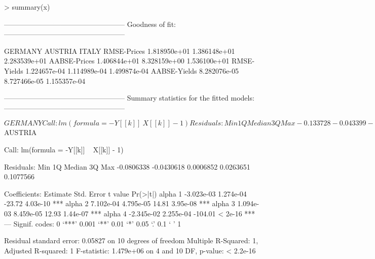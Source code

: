 \begin{Schunk}
\begin{Sinput}
> summary(x)
\end{Sinput}
\begin{Soutput}
---------------------------------------------------
Goodness of fit:
---------------------------------------------------

                  GERMANY      AUSTRIA        ITALY
RMSE-Prices  1.818950e+01 1.386148e+01 2.283539e+01
AABSE-Prices 1.406844e+01 8.328159e+00 1.536100e+01
RMSE-Yields  1.224657e-04 1.114989e-04 1.499874e-04
AABSE-Yields 8.282076e-05 8.727466e-05 1.155357e-04

---------------------------------------------------
Summary statistics for the fitted models:
---------------------------------------------------

$GERMANY

Call:
lm(formula = -Y[[k]] ~ X[[k]] - 1)

Residuals:
      Min        1Q    Median        3Q       Max 
-0.133728 -0.043399 -0.009263  0.019054  0.337135 

Coefficients:
          Estimate Std. Error t value Pr(>|t|)    
alpha 1 -3.156e-03  4.765e-04  -6.623 7.51e-07 ***
alpha 2 -1.804e-04  1.572e-04  -1.148    0.262    
alpha 3  8.893e-04  4.782e-05  18.598 9.25e-16 ***
alpha 4  9.870e-04  6.148e-05  16.053 2.45e-14 ***
alpha 5 -2.357e-02  5.786e-04 -40.734  < 2e-16 ***
---
Signif. codes:  0 ‘***’ 0.001 ‘**’ 0.01 ‘*’ 0.05 ‘.’ 0.1 ‘ ’ 1 

Residual standard error: 0.1084 on 24 degrees of freedom
Multiple R-Squared:     1,	Adjusted R-squared:     1 
F-statistic: 1.693e+06 on 5 and 24 DF,  p-value: < 2.2e-16 


$AUSTRIA

Call:
lm(formula = -Y[[k]] ~ X[[k]] - 1)

Residuals:
       Min         1Q     Median         3Q        Max 
-0.0806338 -0.0430618  0.0006852  0.0263651  0.1077566 

Coefficients:
          Estimate Std. Error t value Pr(>|t|)    
alpha 1 -3.023e-03  1.274e-04  -23.72 4.03e-10 ***
alpha 2  7.102e-04  4.795e-05   14.81 3.95e-08 ***
alpha 3  1.094e-03  8.459e-05   12.93 1.44e-07 ***
alpha 4 -2.345e-02  2.255e-04 -104.01  < 2e-16 ***
---
Signif. codes:  0 ‘***’ 0.001 ‘**’ 0.01 ‘*’ 0.05 ‘.’ 0.1 ‘ ’ 1 

Residual standard error: 0.05827 on 10 degrees of freedom
Multiple R-Squared:     1,	Adjusted R-squared:     1 
F-statistic: 1.479e+06 on 4 and 10 DF,  p-value: < 2.2e-16 



\end{Soutput}
\end{Schunk}
